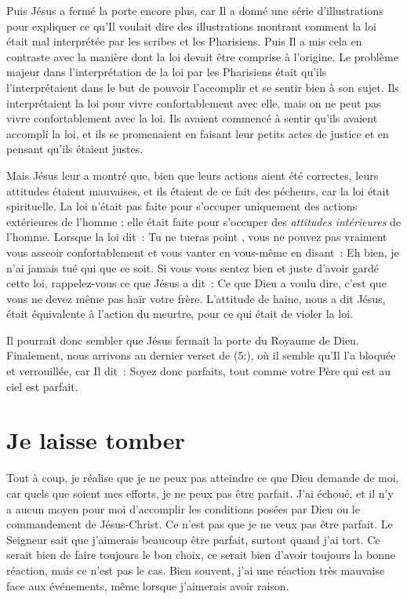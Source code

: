 Puis Jésus a fermé la porte encore plus,
 car Il a donné une série d'illustrations pour expliquer
 ce qu'Il voulait dire \ocadr des illustrations montrant comment la loi
 était mal interprétée par les scribes et les Pharisiens.
 Puis Il a mis cela en contraste avec la manière dont la loi
 devait être comprise à l'origine.
 Le problème majeur dans l'interprétation de la loi par les Pharisiens
 était qu'ils l'interprétaient dans le but de pouvoir l'accomplir
 et se sentir bien à son sujet.
 Ils interprétaient la loi pour vivre confortablement avec elle,
 mais on ne peut pas vivre confortablement avec la loi.
 Ils avaient commencé à sentir qu'ils avaient accompli la loi,
 et ils se promenaient en faisant leur petits actes de justice
 et en pensant qu'ils étaient justes.

Mais Jésus leur a montré que, bien que leurs actions
 aient été correctes, leurs attitudes étaient mauvaises,
 et ils étaient de ce fait des pécheurs,
 car la loi était spirituelle.
 La loi n'était pas faite pour s'occuper uniquement des actions extérieures
 de l'homme ; elle était faite pour s'occuper
 des \emph{attitudes intérieures} de l'homme.
 Lorsque la loi dit~: \og Tu ne tueras point \fg{},
 vous ne pouvez pas vraiment vous asseoir confortablement et vous vanter
 en vous-même en disant~:
 \og Eh bien, je n'ai jamais tué qui que ce soit. \fg{}
 Si vous vous sentez bien et juste d'avoir gardé cette loi,
 rappelez-vous ce que Jésus a dit~:
 \og Ce que Dieu a voulu dire, c'est que vous ne devez même pas
 haïr votre frère. \fg{}
 L'attitude de haine, nous a dit Jésus,
 était équivalente à l'action du meurtre,
 pour ce qui était de violer la loi.

Il pourrait donc sembler que Jésus fermait la porte du Royaume de Dieu.
 Finalement, nous arrivons au dernier verset de (5:),
 où il semble qu'Il l'a bloquée et verrouillée, car Il dit~:
 \og Soyez donc parfaits,
 tout comme votre Père qui est au ciel est parfait. \fg{}


\section*{Je laisse tomber}

Tout à coup, je réalise que je ne peux pas atteindre
 ce que Dieu demande de moi, car quels que soient mes efforts,
 je ne peux pas être parfait.
 J'ai échoué, et il n'y a aucun moyen pour moi d'accomplir
 les conditions posées par Dieu ou le commandement de Jésus-Christ.
 Ce n'est pas que je ne veux pas être parfait.
 Le Seigneur sait que j'aimerais beaucoup être parfait,
 surtout quand j'ai tort.
 Ce serait bien de faire toujours le bon choix,
 ce serait bien d'avoir toujours la bonne réaction,
 mais ce n'est pas le cas.
 Bien souvent, j'ai une réaction très mauvaise face aux événements,
 même lorsque j'aimerais avoir raison.

